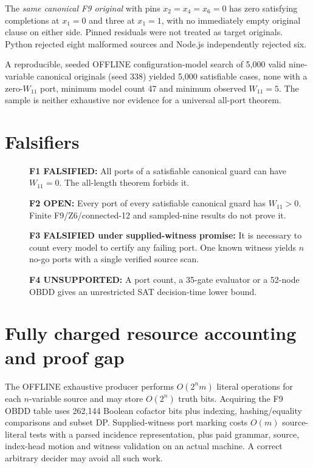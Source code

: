 \documentclass[11pt]{article}
\begin{document}
The \emph{same canonical F9 original} with pins $x_2=x_4=x_6=0$ has zero satisfying completions at $x_1=0$ and three at $x_1=1$, with no immediately empty original clause on either side. Pinned residuals were not treated as target originals. Python rejected eight malformed sources and Node.js independently rejected six.

A reproducible, seeded OFFLINE configuration-model search of 5,000 valid nine-variable canonical originals (seed 338) yielded 5,000 satisfiable cases, none with a zero-$W_{11}$ port, minimum model count 47 and minimum observed $W_{11}=5$. The sample is neither exhaustive nor evidence for a universal all-port theorem.

\section{Falsifiers}
\begin{description}
\item[] \textbf{F1 FALSIFIED:} All ports of a satisfiable canonical guard can have $W_{11}=0$. The all-length theorem forbids it.
\item[] \textbf{F2 OPEN:} Every port of every satisfiable canonical guard has $W_{11}>0$. Finite F9/Z6/connected-12 and sampled-nine results do not prove it.
\item[] \textbf{F3 FALSIFIED under supplied-witness promise:} It is necessary to count every model to certify any failing port. One known witness yields $n$ no-go ports with a single verified source scan.
\item[] \textbf{F4 UNSUPPORTED:} A port count, a 35-gate evaluator or a 52-node OBDD gives an unrestricted SAT decision-time lower bound.
\end{description}

\section{Fully charged resource accounting and proof gap}
The OFFLINE exhaustive producer performs $O(2^nm)$ literal operations for each $n$-variable source and may store $O(2^n)$ truth bits. Acquiring the F9 OBDD table uses 262,144 Boolean cofactor bits plus indexing, hashing/equality comparisons and subset DP. Supplied-witness port marking costs $O(m)$ source-literal tests with a parsed incidence representation, plus paid grammar, source, index-head motion and witness validation on an actual machine. A correct arbitrary decider may avoid all such work.
\end{document}
